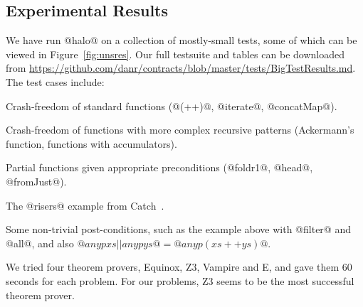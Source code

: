 \subsection{Experimental Results}



We have run @halo@ on a collection of mostly-small tests, 
some of which can be 
viewed in Figure~\ref{fig:unsres}. Our full testsuite and tables can be downloaded from
\url{https://github.com/danr/contracts/blob/master/tests/BigTestResults.md}.
The test cases include:
\begin{itemize*}
  \item Crash-freedom of standard functions
    (@(++)@, @iterate@, @concatMap@).

  \item Crash-freedom of functions with more complex recursive patterns
        (Ackermann's function, functions with accumulators).

%

  \item Partial functions given appropriate preconditions
        (@foldr1@, @head@, @fromJust@).

  \item The @risers@ example from Catch~\citep{Mitchell:2008:PBE:1411286.1411293}.

  \item Some non-trivial post-conditions, such as the example above with @filter@ and @all@,
        and also $@any p xs || any p ys@ = @any p (xs ++ ys)@$.
\end{itemize*}

We tried four theorem provers, Equinox, Z3, Vampire and E, and gave
them 60 seconds for each problem. For our problems, Z3 seems to be the most
successful theorem prover.

